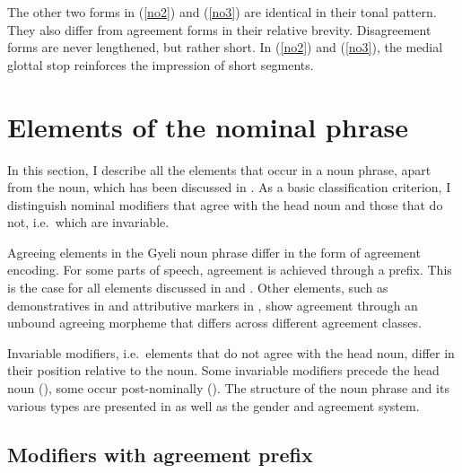 The other two forms in (\ref{no2}) and (\ref{no3}) are identical in their tonal pattern. They also differ from agreement forms in their relative brevity. Disagreement forms are never lengthened, but rather short. In (\ref{no2}) and (\ref{no3}), the medial glottal stop reinforces the impression of short segments.
















\section{Elements of the nominal phrase}
\label{sec:NAdjuncts}

In this section, I describe all the elements that occur in a noun phrase, apart from the noun, which has been discussed in . As a basic classification criterion, I distinguish nominal modifiers that agree with the head noun and those that do not, i.e.\ which are invariable.  
	
	

Agreeing elements in the Gyeli noun phrase differ in the form of agreement encoding. For some parts of speech, agreement is achieved through a prefix. This is the case for all elements discussed in  and . Other elements, such  as demonstratives in  and attributive markers in , show agreement through an unbound agreeing morpheme that differs across different agreement classes.	

Invariable modifiers, i.e.\ elements that do not agree with the head noun, differ in their position relative to the noun. Some invariable modifiers precede the head noun (), some occur post-nominally (). The structure of the noun phrase and its various types are presented in  as well as the gender and agreement system.






\subsection{Modifiers with agreement prefix}
\label{sec:MODAgrPre}


